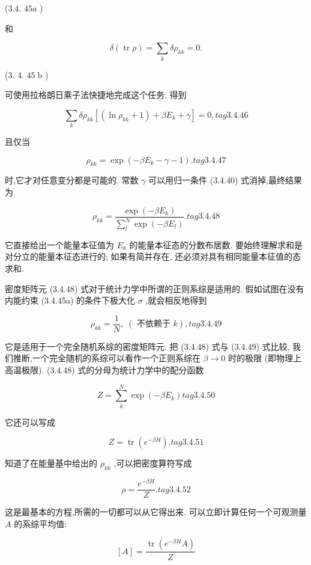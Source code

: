 (3.4. ${45a}$ )

和

$$
\delta \left( {\operatorname{tr}\rho }\right) = \mathop{\sum }\limits_{k}\delta {\rho }_{kk} = 0.
$$

(3. 4. ${45}\mathrm{\;b}$ )

可使用拉格朗日乘子法快捷地完成这个任务. 得到

$$
\mathop{\sum }\limits_{k}\delta {\rho }_{kk}\left\lbrack {\left( {\ln {\rho }_{kk} + 1}\right) + \beta {E}_{k} + \gamma }\right\rbrack = 0, tag{3.4.46}
$$

且仅当

$$
{\rho }_{kk} = \exp \left( {-\beta {E}_{k} - \gamma - 1}\right) . tag{3. 4.47}
$$

时,它才对任意变分都是可能的. 常数 $\gamma$ 可以用归一条件 (3.4.40) 式消掉,最终结果为

$$
{\rho }_{kk} = \frac{\exp \left( {-\beta {E}_{k}}\right) }{\mathop{\sum }\limits_{l}^{N}\exp \left( {-\beta {E}_{l}}\right) }. tag{3. 4.48}
$$

它直接给出一个能量本征值为 ${E}_{k}$ 的能量本征态的分数布居数. 要始终理解求和是对分立的能量本征态进行的; 如果有简并存在, 还必须对具有相同能量本征值的态求和.

密度矩阵元 (3.4.48) 式对于统计力学中所谓的正则系综是适用的. 假如试图在没有内能约束 (3.4.45a) 的条件下极大化 $\sigma$ ,就会相反地得到

$$
{\rho }_{kk} = \frac{1}{N},\;\left( {\text{ 不依赖于 }k}\right) , tag{3.4.49}
$$

它是适用于一个完全随机系综的密度矩阵元. 把 (3.4.48) 式与 (3.4.49) 式比较, 我们推断,一个完全随机的系综可以看作一个正则系综在 $\beta \rightarrow 0$ 时的极限 (即物理上高温极限). (3.4.48) 式的分母为统计力学中的配分函数

$$
Z = \mathop{\sum }\limits_{k}^{N}\exp \left( {-\beta {E}_{k}}\right) tag{3. 4.50}
$$

它还可以写成

$$
Z = \operatorname{tr}\left( {e}^{-{\beta H}}\right) . tag{3. 4.51}
$$

知道了在能量基中给出的 ${\rho }_{kk}$ ,可以把密度算符写成

$$
\rho = \frac{{e}^{-{\beta H}}}{Z}. tag{3. 4.52}
$$

这是最基本的方程,所需的一切都可以从它得出来. 可以立即计算任何一个可观测量 $A$ 的系综平均值:

$$
\left\lbrack A\right\rbrack = \frac{\operatorname{tr}\left( {{e}^{-{\beta H}}A}\right) }{Z}
$$


